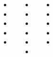 \documentclass[20pt, a1paper ]{tikzposter}
\begin{document}
\begin{columns}

			{				
			\setlength{\leftmargini}{3em}			
			\setlength{\labelsep}{1em} %

			\begin{large}
			\begin{itemize}
			\item 
			\item 
			\item 
			\item 
			\item 
			\end{itemize}
			\end{large}
		}



			{				
			\setlength{\leftmargini}{3em}			
			\setlength{\labelsep}{1em} %

			\begin{large}
			\begin{itemize}
			\item 
			\item 
			\item 
			\item 
			\item 
			\item 
			\end{itemize}
			\end{large}
		}


			{				
			\setlength{\leftmargini}{3em}			
			\setlength{\labelsep}{1em} %

			\begin{large}
			\begin{itemize}
			\item 
			\item 
			\item 
			\item 
			\item 

			\end{itemize}
			\end{large}
		}



\end{columns}
\end{document}
